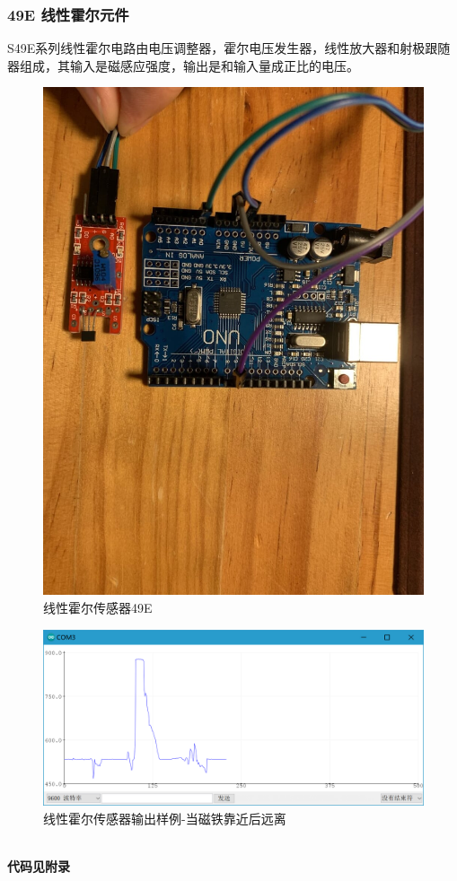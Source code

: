 \documentclass[conference]{IEEEtran}
\theoremstyle{break}
\begin{document}
\subsubsection{49E 线性霍尔元件}
S49E系列线性霍尔电路由电压调整器，霍尔电压发生器，线性放大器和射极跟随器组成，其输入是磁感应强度，输出是和输入量成正比的电压。
\begin{figure}[htbp]
        \centerline{\includegraphics[scale=0.1]{线性霍尔.JPG}}
        \caption{线性霍尔传感器49E}
        \label{fig}
        \end{figure}
        \begin{figure}[htbp]
                \centerline{\includegraphics[scale=0.1]{霍尔输出.png}}
                \caption{线性霍尔传感器输出样例-当磁铁靠近后远离}
                \label{fig}
                \end{figure}
\\
\textbf{代码见附录}
\end{document}
